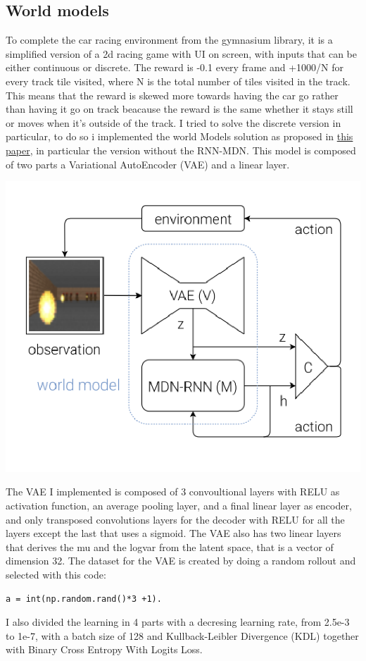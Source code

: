 \documentclass[10pt,a4paper]{article}
\begin{document}
\subsection*{World models}
To complete the car racing environment from the gymnasium library, it is a simplified version of a 2d racing game with UI on screen, with inputs that can be either continuous or discrete.  The reward is
-0.1 every frame and +1000/N for every track tile visited, where N is the total number of tiles visited in the track. This means that the reward is skewed more towards having the car go rather than having it go on track beacause 
the reward is the same whether it stays still or moves when it's outside of the track.
I tried to solve the discrete version in particular, to do so i implemented the world Models solution as proposed in \href{https://doi.org/10.5281/zenodo.1207631}{this paper},
in particular the version without the RNN-MDN. This model is composed of two parts a Variational AutoEncoder (VAE) and a linear layer.


\includegraphics[scale=0.4]{model.png}

The VAE I implemented is composed of 3 convoultional layers with RELU as activation function, an average pooling layer, and a final linear layer as encoder, and only transposed convolutions layers for the decoder with RELU for all the layers except the last that uses a sigmoid.
The VAE also has two linear layers that derives the mu and the logvar from the latent space, that is a vector of dimension 32. The dataset for the VAE is created by doing a random rollout and selected with this code:
\begin{lstlisting}
a = int(np.random.rand()*3 +1).
\end{lstlisting}
I also divided the learning in 4 parts with a decresing learning rate, from 2.5e-3 to 1e-7, with a batch size of 128 and Kullback-Leibler Divergence (KDL) together with Binary Cross Entropy With Logits Loss.
\end{document}
